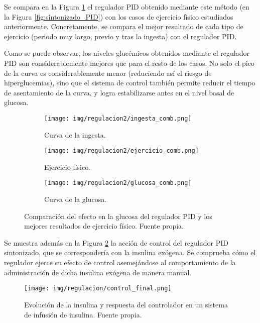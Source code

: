 Se compara en la Figura \ref{fig:ejercicio_PID} el regulador PID obtenido mediante este método (en la Figura \ref{fig:sintonizado_PID}) con los casos de ejercicio físico estudiados anteriormente. Concretamente, se compara el mejor resultado de cada tipo de ejercicio (periodo muy largo, previo y tras la ingesta) con el regulador PID.

Como se puede observar, los niveles glucémicos obtenidos mediante el regulador PID son considerablemente mejores que para el resto de los casos. No solo el pico de la curva es considerablemente menor (reduciendo así el riesgo de hiperglucemias), sino que el sistema de control también permite reducir el tiempo de asentamiento de la curva, y logra estabilizarse antes en el nivel basal de glucosa.
\clearpage

\begin{figure}[htbp]
    \centering
    \begin{subfigure}[b]{0.9\linewidth} %
        \centering
        \texttt{[image: img/regulacion2/ingesta\_comb.png]}
        \caption{Curva de la ingesta.}
    \end{subfigure}
    
    \vspace{0.5cm} %

    \begin{subfigure}[b]{0.9\linewidth} %
        \centering
        \texttt{[image: img/regulacion2/ejercicio\_comb.png]}
        \caption{Ejercicio físico.}
    \end{subfigure}
    
    \vspace{0.5cm} %

    \begin{subfigure}[b]{0.9\linewidth} %
        \centering
        \texttt{[image: img/regulacion2/glucosa\_comb.png]}
        \caption{Curva de la glucosa.}
    \end{subfigure}
    
    \caption{Comparación del efecto en la glucosa del regulador PID y los mejores resultados de ejercicio físico. Fuente propia.}
    \label{fig:ejercicio_PID}
\end{figure}


Se muestra además en la Figura \ref{fig:graf_control_pid} la acción de control del regulador PID sintonizado, que se correspondería con la insulina exógena. Se comprueba cómo el regulador ejerce su efecto de control asemejándose al comportamiento de la administración de dicha insulina exógena de manera manual.
\clearpage
\begin{figure}[htbp]
    \centering
    \texttt{[image: img/regulacion/control\_final.png]}
    \caption{Evolución de la insulina y respuesta del controlador en un sistema de infusión de insulina. Fuente propia.}
    \label{fig:graf_control_pid}
\end{figure}


